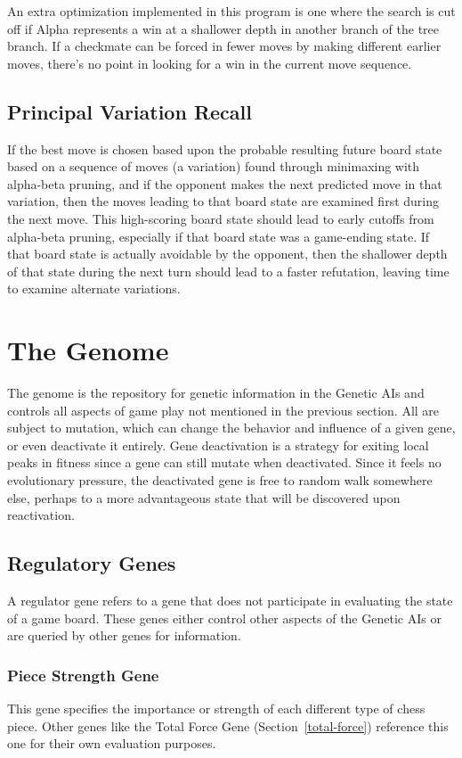 \documentclass[letterpaper]{article}
\renewcommand\_{\textunderscore\allowbreak}
\begin{document}
An extra optimization implemented in this program is one where the search is cut off if Alpha represents a win at a shallower depth in another branch of the tree branch. If a checkmate can be forced in fewer moves by making different earlier moves, there's no point in looking for a win in the current move sequence.

\subsection{Principal Variation Recall}

If the best move is chosen based upon the probable resulting future board state based on a sequence of moves (a variation) found through minimaxing with alpha-beta pruning, and if the opponent makes the next predicted move in that variation, then the moves leading to that board state are examined first during the next move. This high-scoring board state should lead to early cutoffs from alpha-beta pruning, especially if that board state was a game-ending state. If that board state is actually avoidable by the opponent, then the shallower depth of that state during the next turn should lead to a faster refutation, leaving time to examine alternate variations.


\section{The Genome}
\label{gene-section}
The genome is the repository for genetic information in the Genetic AIs and controls all aspects of game play not mentioned in the previous section. All are subject to mutation, which can change the behavior and influence of a given gene, or even deactivate it entirely. Gene deactivation is a strategy for exiting local peaks in fitness since a gene can still mutate when deactivated. Since it feels no evolutionary pressure, the deactivated gene is free to random walk somewhere else, perhaps to a more advantageous state that will be discovered upon reactivation.

\subsection{Regulatory Genes}
A regulator gene refers to a gene that does not participate in evaluating the state of a game board. These genes either control other aspects of the Genetic AIs or are queried by other genes for information.

\subsubsection{Piece Strength Gene}
This gene specifies the importance or strength of each different type of chess piece. Other genes like the Total Force Gene (Section~\ref{total-force}) reference this one for their own evaluation purposes.
\end{document}
